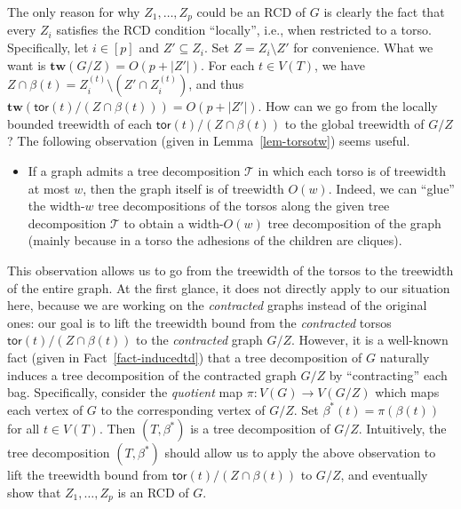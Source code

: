 \documentclass[a4paper,11pt]{article}
\numberwithin{lemma}{section}
\newcommand{\tw}{\mathbf{tw}}
\newcommand{\tor}{\mathsf{tor}}
\begin{document}
The only reason for why $Z_1,\dots,Z_p$ could be an RCD of $G$ is clearly the fact that every $Z_i$ satisfies the RCD condition ``locally'', i.e., when restricted to a torso.
Specifically, let $i \in [p]$ and $Z' \subseteq Z_i$.
Set $Z = Z_i \setminus Z'$ for convenience.
What we want is $\tw(G/Z) = O(p+|Z'|)$.
For each $t \in V(T)$, we have $Z \cap \beta(t) = Z_i^{(t)} \setminus (Z' \cap Z_i^{(t)})$, and thus $\tw(\tor(t)/(Z \cap \beta(t))) = O(p+|Z'|)$.
How can we go from the locally bounded treewidth of each $\tor(t)/(Z \cap \beta(t))$ to the global treewidth of $G/Z$?
The following observation (given in Lemma~\ref{lem-torsotw}) seems useful.
\begin{itemize}
    \item[] If a graph admits a tree decomposition $\mathcal{T}$ in which each torso is of treewidth at most $w$, then the graph itself is of treewidth $O(w)$.
    Indeed, we can ``glue'' the width-$w$ tree decompositions of the torsos along the given tree decomposition $\mathcal{T}$ to obtain a width-$O(w)$ tree decomposition of the graph (mainly because in a torso the adhesions of the children are cliques).
\end{itemize}
This observation allows us to go from the treewidth of the torsos to the treewidth of the entire graph.
At the first glance, it does not directly apply to our situation here, because we are working on the \emph{contracted} graphs instead of the original ones: our goal is to lift the treewidth bound from the \emph{contracted} torsos $\tor(t)/(Z \cap \beta(t))$ to the \emph{contracted} graph $G/Z$.
However, it is a well-known fact (given in Fact~\ref{fact-inducedtd}) that a tree decomposition of $G$ naturally induces a tree decomposition of the contracted graph $G/Z$ by ``contracting'' each bag.
Specifically, consider the \emph{quotient} map $\pi\colon V(G) \to V(G/Z)$ which maps each vertex of $G$ to the corresponding vertex of $G/Z$.
Set $\beta^*(t) = \pi(\beta(t))$ for all $t \in V(T)$.
Then $(T,\beta^*)$ is a tree decomposition of $G/Z$.
Intuitively, the tree decomposition $(T,\beta^*)$ should allow us to apply the above observation to lift the treewidth bound from $\tor(t)/(Z \cap \beta(t))$ to $G/Z$, and eventually show that $Z_1,\dots,Z_p$ is an RCD of $G$.
\end{document}
